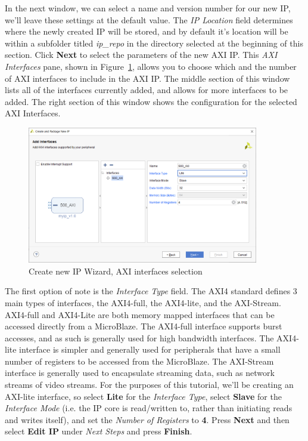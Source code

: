 \documentclass[11pt]{article}
\begin{document}
In the next window, we can select a name and version number for our new IP, we'll leave these settings at the default value. The \textit{IP Location} field determines where the newly created IP will be stored, and by default it's location will be within a subfolder titled \textit{ip\_repo} in the directory selected at the beginning of this section. Click \textbf{Next} to select the parameters of the new AXI IP. This \textit{AXI Interfaces} pane, shown in Figure~\ref{fig:create_axi_ip_options}, allows you to choose which and the number of AXI interfaces to include in the AXI IP. The middle section of this window lists all of the interfaces currently added, and allows for more interfaces to be added. The right section of this window shows the configuration for the selected AXI Interfaces. 

\begin{figure}[!h]
    \centering
    \includegraphics[width=0.9\textwidth]{images/create_axi_ip_options.png}
    \caption{Create new IP Wizard, AXI interfaces selection}
    \label{fig:create_axi_ip_options}
\end{figure}

The first option of note is the \textit{Interface Type} field. The AXI4 standard defines 3 main types of interfaces, the AXI4-full, the AXI4-lite, and the AXI-Stream. AXI4-full and AXI4-Lite are both memory mapped interfaces that can be accessed directly from a MicroBlaze. The AXI4-full interface supports burst accesses, and as such is generally used for high bandwidth interfaces. The AXI4-lite interface is simpler and generally used for peripherals that have a small number of registers to be accessed from the MicroBlaze. The AXI-Stream interface is generally used to encapsulate streaming data, such as network streams of video streams. For the purposes of this tutorial, we'll be creating an AXI-lite interface, so select \textbf{Lite} for the \textit{Interface Type}, select \textbf{Slave} for the \textit{Interface Mode} (i.e. the IP core is read/written to, rather than initiating reads and writes itself), and set the \textit{Number of Registers} to \textbf{4}. Press \textbf{Next} and then select \textbf{Edit IP} under \textit{Next Steps} and press \textbf{Finish}. 
\end{document}
